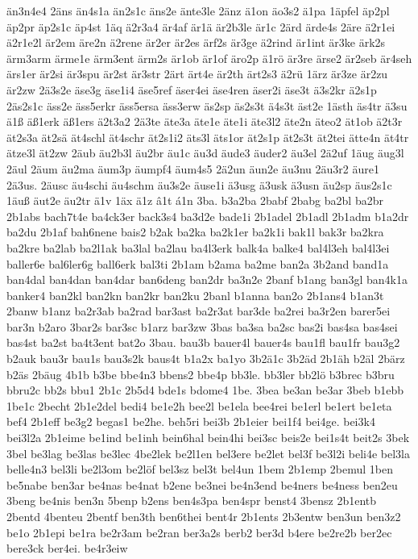 {än3n4e4
2äns
än4s1a
än2s1c
äns2e
änte3le
2änz
ä1on
äo3s2
ä1pa
1äpfel
äp2pl
äp2pr
äp2s1c
äp4st
1äq
ä2r3a4
är4af
är1ä
är2b3le
är1c
2ärd
ärde4s
2äre
ä2r1ei
ä2r1e2l
är2em
äre2n
ä2rene
är2er
är2es
ärf2s
är3ge
ä2rind
är1int
är3ke
ärk2s
ärm3arm
ärme1e
ärm3ent
ärm2s
är1ob
är1of
äro2p
ä1rö
är3re
ärse2
är2seb
är4seh
ärs1er
är2si
är3spu
är2st
är3str
2ärt
ärt4e
är2th
ärt2s3
ä2rü
1ärz
är3ze
är2zu
är2zw
2ä3s2e
äse3g
äse1i4
äse5ref
äser4ei
äse4ren
äser2i
äse3t
ä3s2kr
ä2s1p
2äs2s1c
äss2e
äss5erkr
äss5ersa
äss3erw
äs2sp
äs2s3t
ä4s3t
äst2e
1ästh
äs4tr
ä3su
ä1ß
äß1erk
äß1ers
ä2t3a2
2ä3te
äte3a
äte1e
äte1i
äte3l2
äte2n
äteo2
ät1ob
ä2t3r
ät2s3a
ät2sä
ät4schl
ät4schr
ät2s1i2
äts3l
äts1or
ät2s1p
ät2s3t
ät2tei
ätte4n
ät4tr
ätze3l
ät2zw
2äub
äu2b3l
äu2br
äu1c
äu3d
äude3
äuder2
äu3el
2ä2uf
1äug
äug3l
2äul
2äum
äu2ma
äum3p
äumpf4
äum4s5
2ä2un
äun2e
äu3nu
2äu3r2
äure1
2ä3us.
2äusc
äu4schi
äu4schm
äu3s2e
äuse1i
ä3usg
ä3usk
ä3usn
äu2sp
äus2s1c
1äuß
äut2e
äu2tr
ä1v
1äx
ä1z
â1t
á1n
3ba.
b3a2ba
2babf
2babg
ba2bl
ba2br
2b1abs
bach7t4e
ba4ck3er
back3s4
ba3d2e
bade1i
2b1adel
2b1adl
2b1adm
b1a2dr
ba2du
2b1af
bah6nene
bais2
b2ak
ba2ka
ba2k1er
ba2k1i
bak1l
bak3r
ba2kra
ba2kre
ba2lab
ba2l1ak
ba3lal
ba2lau
ba4l3erk
balk4a
balke4
bal4l3eh
bal4l3ei
baller6e
bal6ler6g
ball6erk
bal3ti
2b1am
b2ama
ba2me
ban2a
3b2and
band1a
ban4dal
ban4dan
ban4dar
ban6deng
ban2dr
ba3n2e
2banf
b1ang
ban3gl
ban4k1a
banker4
ban2kl
ban2kn
ban2kr
ban2ku
2banl
b1anna
ban2o
2b1ans4
b1an3t
2banw
b1anz
ba2r3ab
ba2rad
bar3ast
ba2r3at
bar3de
ba2rei
ba3r2en
barer5ei
bar3n
b2aro
3bar2s
bar3sc
b1arz
bar3zw
3bas
ba3sa
ba2sc
bas2i
bas4sa
bas4sei
bas4st
ba2st
ba4t3ent
bat2o
3bau.
bau3b
bauer4l
bauer4s
bau1fl
bau1fr
bau3g2
b2auk
bau3r
bau1s
bau3s2k
baus4t
b1a2x
ba1yo
3b2ä1c
3b2äd
2b1äh
b2äl
2bärz
b2äs
2bäug
4b1b
b3be
bbe4n3
bbens2
bbe4p
bb3le.
bb3ler
bb2lö
b3brec
b3bru
bbru2c
bb2s
bbu1
2b1c
2b5d4
bde1s
bdome4
1be.
3bea
be3an
be3ar
3beb
b1ebb
1be1c
2becht
2b1e2del
bedi4
be1e2h
bee2l
be1ela
bee4rei
be1erl
be1ert
be1eta
bef4
2b1eff
be3g2
begas1
be2he.
beh5ri
bei3b
2b1eier
bei1f4
bei4ge.
bei3k4
bei3l2a
2b1eime
be1ind
be1inh
bein6hal
bein4hi
bei3sc
beis2e
bei1s4t
beit2s
3bek
3bel
be3lag
be3las
be3lec
4be2lek
be2l1en
bel3ere
be2let
bel3f
be3l2i
beli4e
bel3la
belle4n3
bel3li
be2l3om
be2löf
bel3sz
bel3t
bel4un
1bem
2b1emp
2bemul
1ben
be5nabe
ben3ar
be4nas
be4nat
b2ene
be3nei
be4n3end
be4ners
be4ness
ben2eu
3beng
be4nis
ben3n
5benp
b2ens
ben4s3pa
ben4spr
benst4
3bensz
2b1entb
2bentd
4benteu
2bentf
ben3th
ben6thei
bent4r
2b1ents
2b3entw
ben3un
ben3z2
be1o
2b1epi
be1ra
be2r3am
be2ran
ber3a2s
berb2
ber3d
b4ere
be2re2b
ber2ec
bere3ck
ber4ei.
be4r3eiw
}
